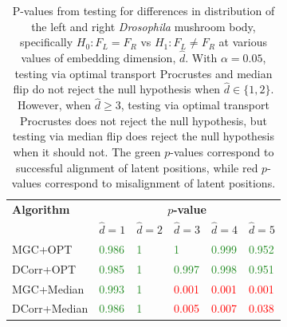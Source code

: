 \begin{table}
\centering
\begin{tabular}{llllll}
\toprule
\textbf{Algorithm} &       \multicolumn{5}{c}{\textbf{$p$-value}}      \\
\cmidrule(lr){2-6} 
  &      $\hat d = 1$ &    $\hat d = 2$ &  $\hat d = 3$ & $\hat d = 4$ & $\hat d = 5$ \\
\midrule
MGC+OPT      &  \textcolor{ForestGreen}{0.986} &  \textcolor{ForestGreen}{1} &  \textcolor{ForestGreen}{1} &  \textcolor{ForestGreen}{0.999} &  \textcolor{ForestGreen}{0.952} \\
DCorr+OPT    &  \textcolor{ForestGreen}{0.985} &  \textcolor{ForestGreen}{1} &  \textcolor{ForestGreen}{0.997} &  \textcolor{ForestGreen}{0.998} &  \textcolor{ForestGreen}{0.951} \\
MGC+Median   &  \textcolor{ForestGreen}{0.993} &  \textcolor{ForestGreen}{1} &  \textcolor{Red}{0.001} &  \textcolor{Red}{0.001} &  \textcolor{Red}{0.001} \\
DCorr+Median &  \textcolor{ForestGreen}{0.986} &  \textcolor{ForestGreen}{1} &  \textcolor{Red}{0.005} &  \textcolor{Red}{0.007} &  \textcolor{Red}{0.038} \\
\bottomrule
\end{tabular}
\caption{P-values from testing for differences in distribution of the left and right \textit{Drosophila} mushroom body, specifically $H_0: F_L = F_R$ vs $H_1: F_L \neq F_R$ at various values of embedding dimension, $\hat d$. With $\alpha=0.05$, testing via optimal transport Procrustes and median flip do not reject the null hypothesis when $\hat d \in \{1, 2\}$. However, when $\hat d \geq 3$, testing via optimal transport Procrustes does not reject the null hypothesis, but testing via median flip does reject the null hypothesis when it should not. The green $p$-values correspond to successful alignment of latent positions, while red $p$-values correspond to misalignment of latent positions.}
\label{tab:pvals}
\end{table}


